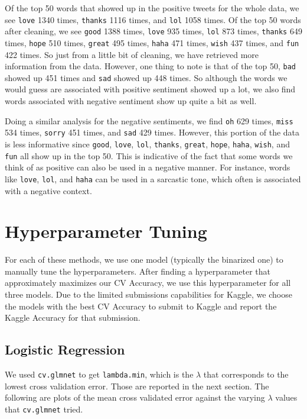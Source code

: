 \documentclass{article}
\begin{document}
Of the top 50 words that showed up in the positive tweets for the whole data, we see \texttt{love} 1340 times, \texttt{thanks} 1116 times, and \texttt{lol} 1058 times. Of the top 50 words after cleaning, we see \texttt{good} 1388 times, \texttt{love} 935 times, \texttt{lol} 873 times, \texttt{thanks} 649 times, \texttt{hope} 510 times, \texttt{great} 495 times, \texttt{haha} 471 times, \texttt{wish} 437 times, and \texttt{fun} 422 times. So just from a little bit of cleaning, we have retrieved more information from the data. However, one thing to note is that of the top 50, \texttt{bad} showed up 451 times and \texttt{sad} showed up 448 times. So although the words we would guess are associated with positive sentiment showed up a lot, we also find words associated with negative sentiment show up quite a bit as well.

Doing a similar analysis for the negative sentiments, we find \texttt{oh} 629 times, \texttt{miss} 534 times, \texttt{sorry} 451 times, and \texttt{sad} 429 times. However, this portion of the data is less informative since \texttt{good}, \texttt{love}, \texttt{lol}, \texttt{thanks}, \texttt{great}, \texttt{hope}, \texttt{haha}, \texttt{wish}, and \texttt{fun} all show up in the top 50. This is indicative of the fact that some words we think of as positive can also be used in a negative manner. For instance, words like \texttt{love}, \texttt{lol}, and \texttt{haha} can be used in a sarcastic tone, which often is associated with a negative context.


\section{Hyperparameter Tuning}
For each of these methods, we use one model (typically the binarized one) to manually tune the hyperparameters. After finding a hyperparameter that approximately maximizes our CV Accuracy, we use this hyperparameter for all three models. Due to the limited submissions capabilities for Kaggle, we choose the models with the best CV Accuracy to submit to Kaggle and report the Kaggle Accuracy for that submission. 

\subsection{Logistic Regression}
We used \texttt{cv.glmnet} to get \texttt{lambda.min}, which is the $\lambda$ that corresponds to the lowest cross validation error. Those are reported in the next section. The following are plots of the mean cross validated error against the varying $\lambda$ values that \texttt{cv.glmnet} tried. \\
\end{document}
